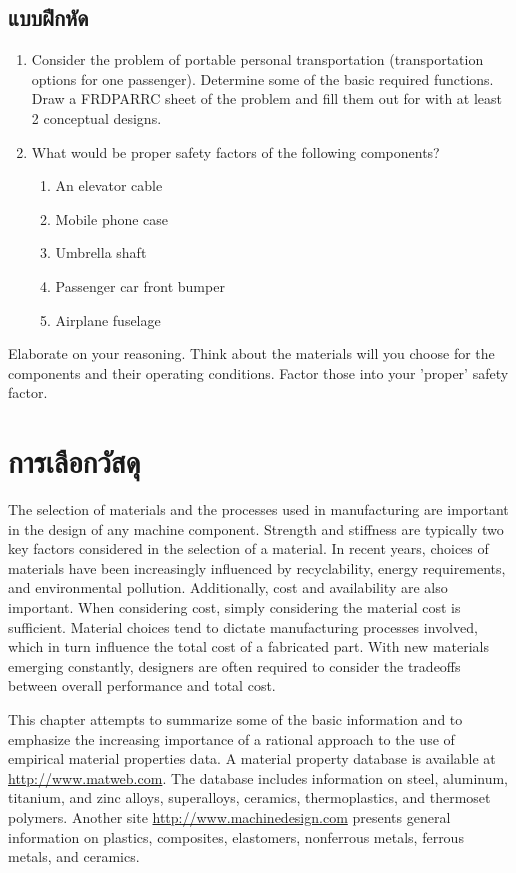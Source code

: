 \documentclass[a4paper,openany,nobib]{tufte-book}
\begin{document}
\subsection{แบบฝึกหัด}
\label{exercises}
\begin{enumerate}
\item Consider the problem of portable personal transportation (transportation options for one passenger). Determine some of the basic required functions. Draw a FRDPARRC sheet of the problem and fill them out for with at least 2 conceptual designs.
\item What would be proper safety factors of the following components?
\begin{enumerate}
\item An elevator cable
\item Mobile phone case
\item Umbrella shaft
\item Passenger car front bumper
\item Airplane fuselage
\end{enumerate}
\end{enumerate}

Elaborate on your reasoning. Think about the materials will you choose for the components and their operating conditions. Factor those into your 'proper' safety factor.

\section{การเลือกวัสดุ}
\label{material-selection}
The selection of materials and the processes used in manufacturing are
important in the design of any machine component. Strength and stiffness
are typically two key factors considered in the selection of a material.
In recent years, choices of materials have been increasingly influenced
by recyclability, energy requirements, and environmental pollution.
Additionally, cost and availability are also important. When considering
cost, simply considering the material cost is sufficient. Material
choices tend to dictate manufacturing processes involved, which in turn
influence the total cost of a fabricated part. With new materials
emerging constantly, designers are often required to consider the
tradeoffs between overall performance and total cost.

This chapter attempts to summarize some of the basic information and to
emphasize the increasing importance of a rational approach to the use of
empirical material properties data. A material property database is
available at \url{http://www.matweb.com}. The database includes
information on steel, aluminum, titanium, and zinc alloys, superalloys,
ceramics, thermoplastics, and thermoset polymers. Another site
\url{http://www.machinedesign.com} presents general information on
plastics, composites, elastomers, nonferrous metals, ferrous metals, and
ceramics.
\end{document}
